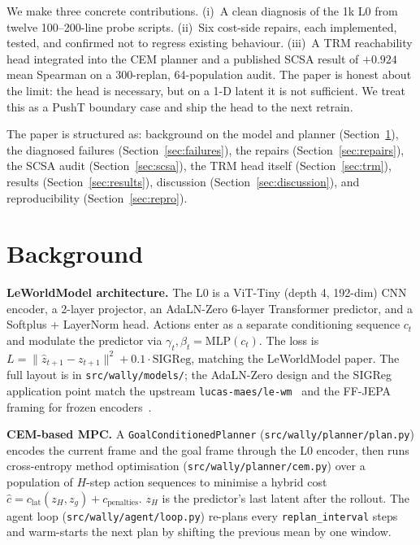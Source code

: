 \documentclass[11pt]{article}
\begin{document}
We make three concrete contributions. (i)~A clean diagnosis of the
1k L0 from twelve 100--200-line probe scripts. (ii)~Six cost-side
repairs, each implemented, tested, and confirmed not to regress
existing behaviour. (iii)~A TRM reachability head integrated into
the CEM planner and a published SCSA result of $+0.924$ mean Spearman
on a 300-replan, 64-population audit. The paper is honest about the
limit: the head is necessary, but on a 1-D latent it is not
sufficient. We treat this as a PushT boundary case and ship the head
to the next retrain.

The paper is structured as: background on the model and planner
(Section~\ref{sec:background}), the diagnosed failures
(Section~\ref{sec:failures}), the repairs (Section~\ref{sec:repairs}),
the SCSA audit (Section~\ref{sec:scsa}), the TRM head itself
(Section~\ref{sec:trm}), results (Section~\ref{sec:results}),
discussion (Section~\ref{sec:discussion}), and reproducibility
(Section~\ref{sec:repro}).

\section{Background}
\label{sec:background}

\textbf{LeWorldModel architecture.}
The L0 is a ViT-Tiny (depth 4, 192-dim) CNN encoder, a 2-layer
projector, an AdaLN-Zero 6-layer Transformer predictor, and a
Softplus + LayerNorm head. Actions enter as a separate conditioning
sequence $c_t$ and modulate the predictor via
$\gamma_t, \beta_t = \mathrm{MLP}(c_t)$. The loss is
$L = \|\hat{z}_{t+1} - z_{t+1}\|^2 + 0.1 \cdot \mathrm{SIGReg}$,
matching the LeWorldModel paper. The full layout is in
\texttt{src/wally/models/}; the AdaLN-Zero design and the SIGReg
application point match the upstream
\texttt{lucas-maes/le-wm}~\cite{lewm} and the FF-JEPA framing
for frozen encoders~\cite{ffjepa}.

\textbf{CEM-based MPC.}
A \texttt{GoalConditionedPlanner} (\texttt{src/wally/planner/plan.py})
encodes the current frame and the goal frame through the L0 encoder,
then runs cross-entropy method optimisation
(\texttt{src/wally/planner/cem.py}) over a population of $H$-step
action sequences to minimise a hybrid cost
$\hat c = c_{\mathrm{lat}}(z_H, z_g) + c_{\mathrm{penalties}}$.
$z_H$ is the predictor's last latent after the rollout. The agent
loop (\texttt{src/wally/agent/loop.py}) re-plans every
\texttt{replan\_interval} steps and warm-starts the next plan by
shifting the previous mean by one window.
\end{document}
